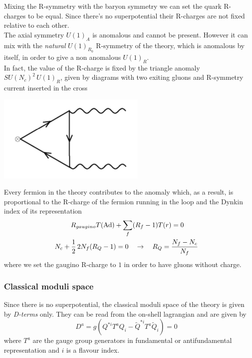 Mixing the R-symmetry with the baryon symmetry we can set the quark R-charges to be equal.
Since there's no superpotential their R-charges are not fixed relative to each other.
\\
The axial symmetry $U(1)_A$ is anomalous and cannot be present.
However it can mix with the \emph{natural} $U(1)_{R_0}$ R-symmetry of the theory, which is anomalous by itself, in order to give a non anomalous $U(1)_R$.\\
In fact, the value of the R-charge is fixed by the triangle anomaly $SU(N_c)^2 \, U(1)_R $, given by diagrams with two exiting gluons and R-symmetry current inserted in the cross 
\begin{center}
\includegraphics[scale=0.6]{r-symm_anomlay.png}
\end{center}
Every fermion in the theory contributes to the anomaly which, as a result, is proportional to the R-charge of the fermion running in the loop and the Dynkin index of its representation
\begin{align*}
R_{gaugino} T (\hbox{Ad}) + \sum_{ f} (& R_{f} - 1)  T(r)   = 0 \\
N_c + \frac{1}{2}\,  2 N_f (R_Q -1)  = 0 \quad & \rightarrow \quad R_Q = \frac{N_f - N_c}{N_f}
\end{align*}
where we set  the gaugino R-charge to $1$ in order to have gluons without charge.\\


\subsubsection{Classical moduli space}
Since there is no superpotential, the classical moduli space of the theory is given by \emph{D-terms} only. 
They can be read from the on-shell lagrangian and are given by
\begin{equation}
 D^a = g \left( Q^{*i} T^a Q_i - \tilde{Q}^{* i} T^a \tilde{Q}_i \right) = 0
\end{equation}
where $T^a$ are the gauge group generators in fundamental or antifundamental representation and $i$ is a flavour index.

